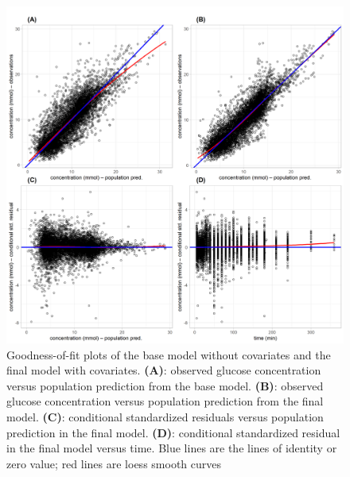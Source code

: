 \documentclass[utf8]{frontiersSCNS} %
\begin{document}
\begin{figure}[h!]
\begin{center}
\includegraphics[width=15cm]{comb.PNG}
\end{center}
\caption{Goodness-of-fit plots of the base model without covariates and the final model with covariates. \textbf{(A)}: observed glucose concentration versus population prediction from the base model. \textbf{(B)}: observed glucose concentration versus population prediction from the final model. \textbf{(C)}: conditional standardized residuals versus population prediction in  the final model. \textbf{(D)}: conditional standardized residual in the final model versus time. Blue lines are the lines of identity or zero value; red lines are loess smooth curves}
\label{fig: fittings}
\end{figure}
\end{document}
